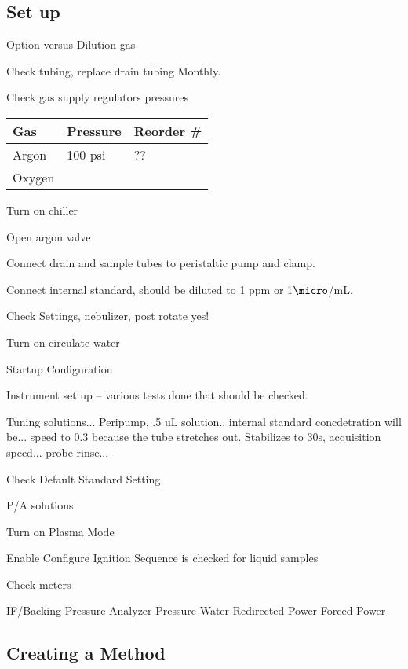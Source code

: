 \documentclass[12pt]{../SOP3_beta}\usepackage[]{graphicx}\usepackage[]{color}
\begin{document}
\subsection{Set up}

\NP Option versus Dilution gas

\NP Check tubing, replace drain tubing Monthly.

\NP Check gas supply regulators pressures

\begin{table}[h]
\begin{tabular}{lll} \hline
Gas   &     Pressure    & Reorder \# \\ \hline\hline
Argon &       100 psi   & ??          \\
Oxygen&                 & \\ \hline

\end{tabular}
\end{table}

\NP Turn on chiller

\NP Open argon valve

\NP Connect drain and sample tubes to peristaltic pump and clamp.

\NP Connect internal standard, should be diluted to 1 ppm or 1$\micro$/mL. 

\NP Check Settings, nebulizer, post rotate yes!

\NP Turn on circulate water

\NP Startup Configuration

\NP Instrument set up -- various tests done that should be checked.

\NP Tuning solutions... Peripump, .5 uL solution.. internal standard concdetration will be...  speed to 0.3 because the tube stretches out. Stabilizes to 30s, acquisition speed... probe rinse... 

\NP Check Default Standard Setting

\NP P/A solutions

\NP Turn on Plasma Mode 

\NP Enable Configure Ignition Sequence is checked for liquid samples

\NP Check meters 

IF/Backing Pressure
Analyzer Pressure
Water
Redirected Power
Forced Power



\NP 


\subsection{Creating a Method}
\end{document}
